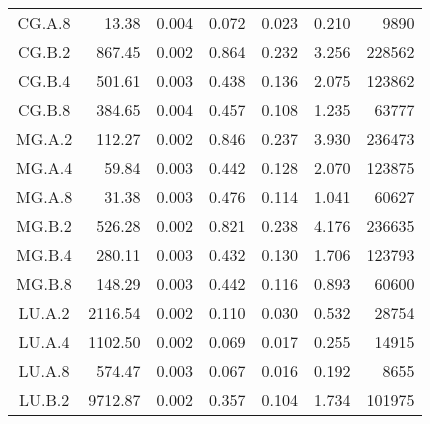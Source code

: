 \begin{threeparttable}
\begin{longtable}[c]{c*{6}{r}}
        CG.A.8                 & 13.38                               & 0.004                               & 0.072          & 0.023 & 0.210 & 9890   \\
        CG.B.2                 & 867.45                              & 0.002                               & 0.864          & 0.232 & 3.256 & 228562 \\
        CG.B.4                 & 501.61                              & 0.003                               & 0.438          & 0.136 & 2.075 & 123862 \\
        CG.B.8                 & 384.65                              & 0.004                               & 0.457          & 0.108 & 1.235 & 63777  \\
        MG.A.2                 & 112.27                              & 0.002                               & 0.846          & 0.237 & 3.930 & 236473 \\
        MG.A.4                 & 59.84                               & 0.003                               & 0.442          & 0.128 & 2.070 & 123875 \\
        MG.A.8                 & 31.38                               & 0.003                               & 0.476          & 0.114 & 1.041 & 60627  \\
        MG.B.2                 & 526.28                              & 0.002                               & 0.821          & 0.238 & 4.176 & 236635 \\
        MG.B.4                 & 280.11                              & 0.003                               & 0.432          & 0.130 & 1.706 & 123793 \\
        MG.B.8                 & 148.29                              & 0.003                               & 0.442          & 0.116 & 0.893 & 60600  \\
        LU.A.2                 & 2116.54                             & 0.002                               & 0.110          & 0.030 & 0.532 & 28754  \\
        LU.A.4                 & 1102.50                             & 0.002                               & 0.069          & 0.017 & 0.255 & 14915  \\
        LU.A.8                 & 574.47                              & 0.003                               & 0.067          & 0.016 & 0.192 & 8655   \\
        LU.B.2                 & 9712.87                             & 0.002                               & 0.357          & 0.104 & 1.734 & 101975 \\

\end{longtable}
\end{threeparttable}
